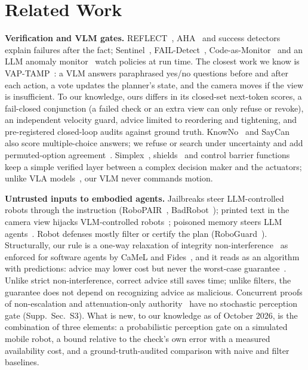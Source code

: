 \documentclass[conference]{IEEEtran}
\begin{document}
\section{Related Work}\label{sec:related}
\textbf{Verification and VLM gates.}
REFLECT~\cite{liu2023reflect}, AHA~\cite{duan2025aha} and success detectors~\cite{du2023successdetectors} explain failures after the fact; Sentinel~\cite{agia2025sentinel}, FAIL-Detect~\cite{xu2025faildetect},
Code-as-Monitor~\cite{zhou2025codeasmonitor} and an LLM anomaly monitor~\cite{sinha2024realtime} watch policies at run time.
The closest work we know is VAP-TAMP~\cite{oloo2026vaptamp}: a VLM answers paraphrased yes/no questions before and after each action, a vote updates the planner's state, and the camera moves if the view is insufficient.
To our knowledge, ours differs in its closed-set next-token scores, a fail-closed conjunction (a failed check or an extra view can only refuse or revoke), an independent velocity guard, advice limited to reordering and tightening, and pre-registered closed-loop audits against ground truth.
KnowNo~\cite{ren2023knowno} and SayCan~\cite{ichter2023saycan} also score multiple-choice answers; we refuse or search under uncertainty and add permuted-option agreement~\cite{zheng2024mcselectors,pezeshkpour2024order,robinson2023mcqa}.
Simplex~\cite{seto1998simplex,sha2001simplicity}, shields~\cite{alshiekh2018shielding} and control barrier functions~\cite{ames2019cbf} keep a simple verified layer between a complex decision maker and the actuators; unlike VLA models~\cite{zitkovich2023rt2,kim2025openvla}, our VLM never commands motion.

\textbf{Untrusted inputs to embodied agents.}
Jailbreaks steer LLM-controlled robots through the instruction (RoboPAIR~\cite{robey2025jailbreaking}, BadRobot~\cite{zhang2025badrobot}); printed text in the camera view hijacks VLM-controlled robots~\cite{burbano2026chai,samarakoon2026paper}; poisoned memory steers LLM agents~\cite{chen2024agentpoison}. Robot defenses mostly filter or certify the plan (RoboGuard~\cite{ravichandran2026guardrails}).
Structurally, our rule is a one-way relaxation of integrity non-interference~\cite{biba1977integrity,denning1976lattice} as enforced for software agents by CaMeL and Fides~\cite{debenedetti2025camel,costa2025fides}, and it reads as an algorithm with predictions: advice may lower cost but never the worst-case guarantee~\cite{lykouris2021competitive,dinitz2021faster}. Unlike strict non-interference, correct advice still saves time; unlike filters, the guarantee does not depend on recognizing advice as malicious.
Concurrent proofs of non-escalation and attenuation-only authority~\cite{chepuri2026authguardr,trantruong2026delegateguard,kravchenko2026appa,akewar2026safecommit} have no stochastic perception gate (Supp.~Sec.~S3). What is new, to our knowledge as of October 2026, is the combination of three elements: a probabilistic perception gate on a simulated mobile robot, a bound relative to the check's own error with a measured availability cost, and a ground-truth-audited comparison with naive and filter baselines.
\end{document}
